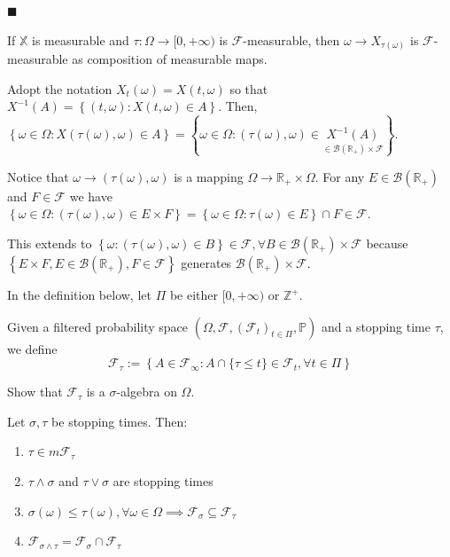$\blacksquare$

\begin{remark}
    If $\mathbb{X}$ is measurable and $\tau: \Omega \to [0, +\infty)$ is $\mathcal{F}$-measurable, then $\omega \to X_{\tau(\omega)}$ is $\mathcal{F}$-measurable as composition of measurable maps.

    Adopt the notation $X_{t}(\omega)= X(t,\omega)$ so that $X^{-1}(A)= \left\{(t, \omega): X(t, \omega) \in A \right\}$.
    Then, $\left\{\omega \in \Omega: X(\tau(\omega), \omega) \in A\right\} =  \left\{\omega \in \Omega: (\tau(\omega), \omega) \in \underset{\in \mathcal{B}(\mathbb{R}_{+}) \times \mathcal{F}}{X^{-1}(A)} \right\}$.

    Notice that $\omega \to (\tau(\omega), \omega)$ is a mapping $\Omega \to \mathbb{R}_{+} \times \Omega$. For any $E \in \mathcal{B}(\mathbb{R}_{+})$ and $F \in \mathcal{F}$ we have $\left\{\omega \in \Omega: (\tau(\omega), \omega) \in E \times F \right\} = \left\{ \omega \in \Omega: \tau(\omega) \in E \right\} \cap F \in \mathcal{F}$.

    This extends to $\left\{\omega: (\tau(\omega), \omega) \in B \right\} \in \mathcal{F}, \forall B \in \mathcal{B}(\mathbb{R}_{+}) \times \mathcal{F}$ because $\left\{E \times F, E \in \mathcal{B}(\mathbb{R}_{+}), F \in \mathcal{F} \right\}$ generates $\mathcal{B}(\mathbb{R}_{+}) \times \mathcal{F}$. 
\end{remark}  

In the definition below, let $\Pi$ be either $[0, + \infty)$ or $\mathbb{Z}^{+}$.

\begin{definition}
    Given a filtered probability space $(\Omega, \mathcal{F}, (\mathcal{F}_{t})_{t \in \Pi}, \mathbb{P})$ and a stopping time $\tau$, we define $$\mathcal{F}_{\tau} := \left\{A \in \mathcal{F}_{\infty}: A \cap \{\tau \leq t\} \in \mathcal{F}_{t}, \forall t \in \Pi \right\}$$
\end{definition}

\begin{homework}
    Show that $\mathcal{F}_{\tau}$ is a $\sigma$-algebra on $\Omega$.
\end{homework}

\begin{proposition}
    Let $\sigma, \tau$ be stopping times. Then: 
    \begin{enumerate}
        \item $\tau \in m\mathcal{F}_{\tau}$
        \item $\tau \wedge \sigma$ and $\tau \vee \sigma$ are stopping times
        \item $\sigma(\omega) \leq \tau(\omega), \forall \omega \in \Omega \implies \mathcal{F}_{\sigma} \subseteq \mathcal{F}_{\tau}$
        \item $\mathcal{F}_{\sigma \wedge \tau}= \mathcal{F}_{\sigma} \cap \mathcal{F}_{\tau}$
    \end{enumerate}
\end{proposition}

